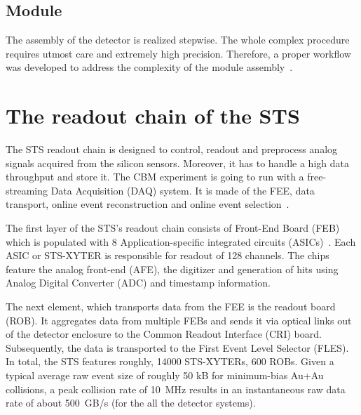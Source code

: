 \subsection{Module}
\label{module}
 The assembly of the detector is realized stepwise. The whole complex procedure requires utmost care and extremely high precision. Therefore, a proper workflow was developed to address the complexity of the module assembly~\cite{carmen2}.

\section{The readout chain of the STS}
\label{readout}
\label{DAQ}
The \gls{STS} readout chain is designed to control, readout and preprocess analog signals acquired from the silicon sensors. Moreover, it has to handle a high data throughput and store it. The \gls{CBM} experiment is going to run with a free-streaming Data Acquisition (\gls{DAQ}) system. It is made of the \gls{FEE}, data transport, online event reconstruction and online event selection~\cite{Kasinski1}.

The first layer of the \gls{STS}'s readout chain consists of Front-End Board (\gls{FEB}) which is populated with 8  Application-specific integrated circuits (ASICs)~\cite{Kasinski2}. Each ASIC or STS-XYTER is responsible for readout of 128 channels. The chips feature the analog front-end (\gls{AFE}), the digitizer and generation of hits using Analog Digital Converter (\gls{ADC}) and timestamp information. 

The next element, which transports data from the \gls{FEE} is the readout board (\gls{ROB}). It aggregates data from multiple \glspl{FEB} and sends it via optical links out of the detector enclosure to the Common Readout Interface (\gls{CRI}) board. Subsequently, the data is transported to the First Event Level Selector (\gls{FLES}). 
\newpage
In total, the \gls{STS} features roughly, 14000 STS-XYTERs, 600 \glspl{ROB}. Given a typical average raw event size of roughly 50 kB for minimum-bias Au+Au collisions, a peak collision rate of 10~MHz results in an instantaneous raw data rate of about 500~GB/s (for the all the detector systems).

